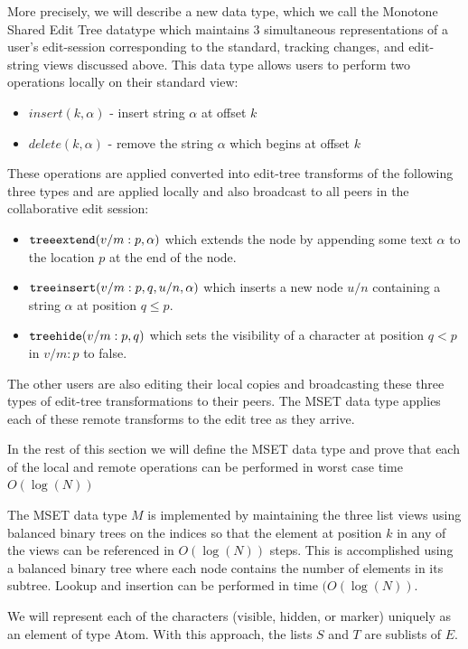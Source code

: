 \documentclass{amsart}
\begin{document}
More precisely, we will describe a new data type, which we call the Monotone Shared Edit Tree datatype which maintains 3 simultaneous representations of a user's edit-session corresponding to the standard, tracking changes, and edit-string views discussed above. This data type allows users to perform two operations locally on their standard view:
\begin{itemize}
\item $insert(k,\alpha)$ - insert string $\alpha$ at offset $k$
\item $delete(k,\alpha)$ - remove the string $\alpha$ which begins at offset $k$
\end{itemize}
These operations are applied converted into edit-tree transforms of the following three types
and are applied locally and also broadcast to all peers in the collaborative edit session:
\begin{itemize}
\item ${\tt treeextend}(v/m:p,\alpha)$ which extends the node by appending
some text $\alpha$ to the location $p$ at the end of the node.
\item ${\tt treeinsert}(v/m:p,q,u/n,\alpha) $ which
 inserts a new node $u/n$ containing a string $\alpha$
at position $q\le p$. 
\item ${\tt treehide}(v/m:p,q)$ which sets
 the visibility of a character at position $q < p$
in  $v/m:p$ to false. 
\end{itemize}
The other users are also editing their local copies and broadcasting these three types of edit-tree transformations to their peers. The MSET data type applies each of these remote transforms to the edit tree as they arrive.

In the rest of this section we will define the MSET data type and prove that each of the local and remote operations can be performed in worst case time $O(\log(N))$



The MSET data type $M$ is implemented by maintaining the three list views using balanced binary trees on the indices so that the element at position $k$ in any of the views can be referenced in $O(\log(N))$ steps.  This is accomplished using a balanced binary tree where each node contains the number of elements in its subtree. Lookup and insertion can be performed in time $(O(\log(N))$.

We will represent each of the characters (visible, hidden, or marker) uniquely as an
element of type Atom.  With this approach, the lists $S$ and $T$ are sublists of $E$.
\end{document}
